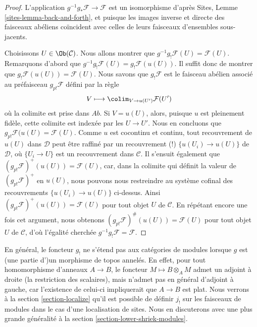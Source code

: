 \begin{proof}
L'application $g^{-1}g_*\mathcal{F} \to \mathcal{F}$ est un isomorphisme
d'après Sites, Lemme \ref{sites-lemma-back-and-forth}, et puisque les images
inverse et directe des faisceaux abéliens coïncident avec celles de leurs
faisceaux d'ensembles sous-jacents.

\medskip\noindent
Choisissons $U \in \Ob(\mathcal{C})$. Nous allons montrer que
$g^{-1}g_!\mathcal{F}(U) = \mathcal{F}(U)$. Remarquons d'abord que
$g^{-1}g_!\mathcal{F}(U) = g_!\mathcal{F}(u(U))$. Il suffit donc de montrer que
$g_!\mathcal{F}(u(U)) = \mathcal{F}(U)$. Nous savons que $g_!\mathcal{F}$ est
le faisceau abélien associé au préfaisceau $g_{p!}\mathcal{F}$ défini par la
règle
$$
V \longmapsto \colim_{V \to u(U')} \mathcal{F}(U')
$$
où la colimite est prise dans $\textit{Ab}$. Si $V = u(U)$, alors, puisque $u$
est pleinement fidèle, cette colimite est indexée par les $U \to U'$. Nous en
concluons que $g_{p!}\mathcal{F}(u(U) = \mathcal{F}(U)$. Comme $u$ est
cocontinu et continu, tout recouvrement de $u(U)$ dans $\mathcal{D}$ peut être
raffiné par un recouvrement (!) $\{u(U_i) \to u(U)\}$ de $\mathcal{D}$, où
$\{U_i \to U\}$ est un recouvrement dans $\mathcal{C}$. Il s'ensuit également
que $(g_{p!}\mathcal{F})^+(u(U)) = \mathcal{F}(U)$, car, dans la colimite qui
définit la valeur de $(g_{p!}\mathcal{F})^+$ en $u(U)$, nous pouvons nous
restreindre au système cofinal des recouvrements
$\{u(U_i) \to u(U)\}$ ci-dessus. Ainsi
$(g_{p!}\mathcal{F})^+(u(U)) = \mathcal{F}(U)$ pour tout objet $U$ de
$\mathcal{C}$. En répétant encore une fois cet argument, nous obtenons
$(g_{p!}\mathcal{F})^\#(u(U)) = \mathcal{F}(U)$ pour tout objet $U$ de
$\mathcal{C}$, d'où l'égalité cherchée $g^{-1}g_!\mathcal{F} = \mathcal{F}$.
\end{proof}

\begin{remark}
\label{remark-no-extension}
En général, le foncteur $g_!$ ne s'étend pas aux catégories de modules lorsque
$g$ est (une partie d')un morphisme de topos annelés. En effet, pour tout
homomorphisme d'anneaux $A \to B$, le foncteur
$M \mapsto B \otimes_A M$ admet un adjoint à droite (la restriction des
scalaires), mais n'admet pas en général d'adjoint à gauche, car l'existence de
celui-ci impliquerait que $A \to B$ est plat. Nous verrons à la section
\ref{section-localize} qu'il est possible de définir $j_!$ sur les faisceaux de
modules dans le cas d'une localisation de sites. Nous en discuterons avec une
plus grande généralité à la section \ref{section-lower-shriek-modules}.
\end{remark}

